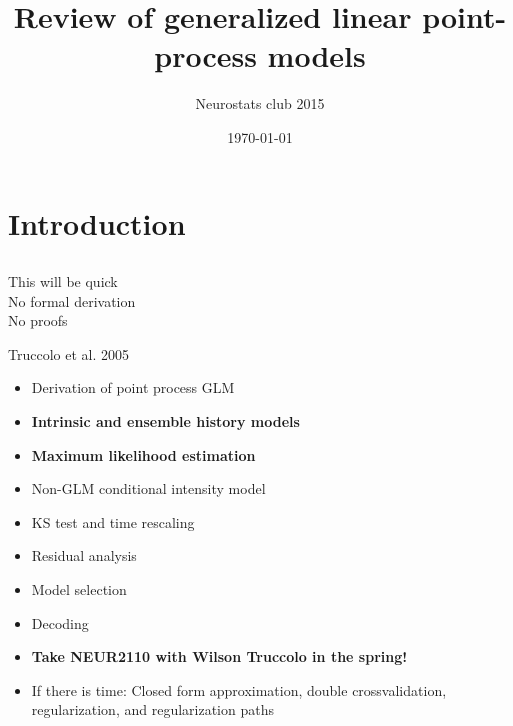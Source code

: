 \documentclass[svgnames,13pt,handout]{beamer}
\DeclareRobustCommand{\emph}[1]{\textbf{{\color{emphasizecolor} #1}}}
\begin{document}
\title   {Review of generalized linear point-process models}
\author  {Neurostats club 2015}
\subtitle{}
\date    {\today}
\begin{frame} \titlepage \end{frame}

\section{Introduction}


\subsection{}

\begin{frame}{}
\begin{center}
	\large This will be quick\\
	No formal derivation\\
	No proofs
\end{center}
\end{frame} 

\begin{frame}{Truccolo et al. 2005}
\begin{itemize}
	\item Derivation of point process GLM
	\item \emph{Intrinsic and ensemble history models}
	\item \emph{Maximum likelihood estimation}
	\item Non-GLM conditional intensity model
	\item KS test and time rescaling
	\item Residual analysis
	\item Model selection
	\item Decoding
	\item \emph{Take NEUR2110 with Wilson Truccolo in the spring!}
	\item If there is time: Closed form approximation, double crossvalidation, regularization, and regularization paths
\end{itemize}
\end{frame} 
\end{document}
